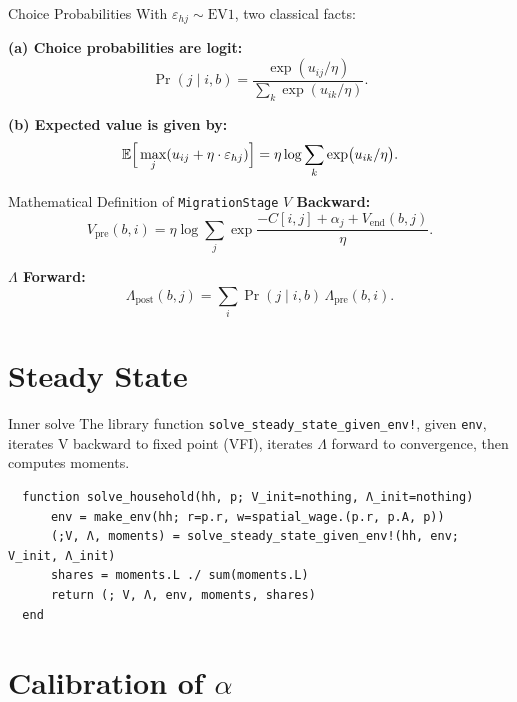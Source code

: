 \documentclass[10pt,aspectratio=169]{beamer}
\begin{document}
\begin{frame}{Choice Probabilities}
  With $\varepsilon_{hj} \sim \text{EV1}$, two classical facts:

  \textbf{(a) Choice probabilities are logit:}
  \[
  \Pr(j \mid i, b) = \frac{\exp(u_{ij} / \eta)}{\sum_k \exp(u_{ik} / \eta)}.
  \]

  \textbf{(b) Expected value is given by:}
  \[
  \mathbb{E}\Big[\max_j (u_{ij} + \eta \cdot \varepsilon_{hj})\Big] = \eta \log \sum_k \exp\!\big(u_{ik} / \eta \big).
  \]
\end{frame}

\begin{frame}{Mathematical Definition of \texttt{MigrationStage}}
  \textbf{$V$ Backward:}
  \[
  V_{\text{pre}}(b, i) = \eta \log \sum_j \exp\!\frac{- C[i,j] + \alpha_j + V_{\text{end}}(b, j)}{\eta}.
  \]

  \textbf{$\Lambda$ Forward:}
  \[
  \Lambda_{\text{post}}(b, j) = \sum_i \Pr(j \mid i, b)\, \Lambda_{\text{pre}}(b, i).
  \]
\end{frame}

\section[Steady State]{Steady State}

\begin{frame}[fragile]{Inner solve}
  The library function \texttt{solve\_steady\_state\_given\_env!}, given \texttt{env}, iterates V backward to fixed point (VFI), iterates $\Lambda$ forward to convergence, then computes moments.

  \begin{lstlisting}
  function solve_household(hh, p; V_init=nothing, Λ_init=nothing)
      env = make_env(hh; r=p.r, w=spatial_wage.(p.r, p.A, p))
      (;V, Λ, moments) = solve_steady_state_given_env!(hh, env; V_init, Λ_init)
      shares = moments.L ./ sum(moments.L)
      return (; V, Λ, env, moments, shares)
  end
  \end{lstlisting}
\end{frame}

\section[$\alpha$ Calibration]{Calibration of $\alpha$}
\end{document}
